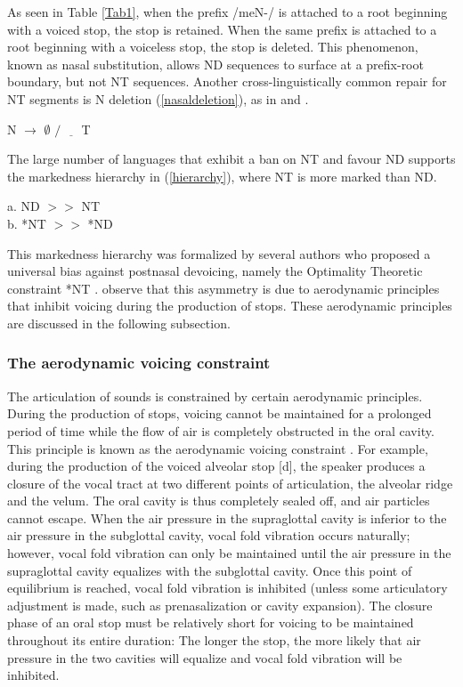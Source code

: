 \documentclass[output=paper,hidelinks]{langscibook}
\begin{document}
As seen in Table \ref{Tab1}, when the prefix /meN-/ is attached to a root beginning with a voiced stop, the stop is retained. When the same prefix is attached to a root beginning with a voiceless stop, the stop is deleted. This phenomenon, known as nasal substitution, allows ND sequences to surface at a prefix-root boundary, but not NT sequences. Another cross-linguistically common repair for NT segments is N deletion (\ref{nasaldeletion}), as in  and  \citep{Pater2001}.

\ea\label{nasaldeletion} N $\rightarrow$ $\emptyset$ $/$ $\underline{\hspace{1em}}$ T
\z

The large number of languages that exhibit a ban on NT and favour ND supports the markedness hierarchy in (\ref{hierarchy}), where NT is more marked than ND.

\begin{multicols}{2}
\ea\label{hierarchy} a. ND $>>$ NT \\
b. *NT $>>$ *ND \z
\end{multicols}


This markedness hierarchy was formalized by several authors who proposed a universal bias against postnasal devoicing, namely the Optimality Theoretic constraint *NT \citep{HayesStivers1995, Hayes1999, Pater1996, Pater1999, Hyman2001}. \citet{Gouskova2011} observe that this asymmetry is due to aerodynamic principles that inhibit voicing during the production of stops. These aerodynamic principles are discussed in the following subsection.

\subsubsection{The aerodynamic voicing constraint}\label{sec:lapierre:1.2.1}
\largerpage
The articulation of sounds is constrained by certain aerodynamic principles. During the production of stops, voicing cannot be maintained for a prolonged period of time while the flow of air is completely obstructed in the oral cavity. This principle is known as the aerodynamic voicing constraint \citep{Ohala1993phonetics, Ohala2011}. For example, during the production of the voiced alveolar stop [d], the speaker produces a closure of the vocal tract at two different points of articulation, the alveolar ridge and the velum. The oral cavity is thus completely sealed off, and air particles cannot escape. When the air pressure in the supraglottal cavity is inferior to the air pressure in the subglottal cavity, vocal fold vibration occurs naturally; however, vocal fold vibration can only be maintained until the air pressure in the supraglottal cavity equalizes with the subglottal cavity. Once this point of equilibrium is reached, vocal fold vibration is inhibited (unless some articulatory adjustment is made, such as prenasalization or cavity expansion). The closure phase of an oral stop must be relatively short for voicing to be maintained throughout its entire duration: The longer the stop, the more likely that air pressure in the two cavities will equalize and vocal fold vibration will be inhibited.
\end{document}
